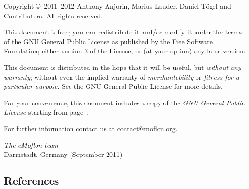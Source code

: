 \documentclass[11pt,a4paper, twoside]{book}
\begin{document}
   
  
\frontmatter   

\maketitle

\begin{small} 
  Copyright \copyright~2011--2012 Anthony Anjorin, Marius Lauder, Daniel T\"ogel 
  and Contributors. All rights reserved.

  This document is free; you can redistribute it and/or modify it
  under the terms of the GNU General Public License as published by
  the Free Software Foundation; either version 3 of the License, or
  (at your option) any later version.
 
  This document is distributed in the hope that it will be useful, but
  \emph{without any warranty}; without even the implied warranty of
  \emph{merchantability} or \emph{fitness for a particular purpose}.
  See the GNU General Public License for more details.
 
  For your convenience, this document includes a copy of the \emph{GNU General
  Public License} starting from page~\pageref{chap:gpl}.
  
  For further information contact us at
  \href{mailto:contact@moflon.org}{contact@moflon.org}.
  
  \vskip3cm
  \textit{The eMoflon team}\\
  Darmstadt, Germany (September 2011)
\end{small}


\tableofcontents

\setcounter{romanpages}{\value{page}}

\mainmatter











 


\begin{appendix}
\setcounter{page}{\value{romanpages}}
\addtocounter{page}{1} 
\let\originalclearpage=\clearpage
\def\clearpage{\relax}
\renewcommand*{\bibname}{}
\chapter{References}\vskip-4cm
  
 
\newpage


\end{appendix}
\end{document}
